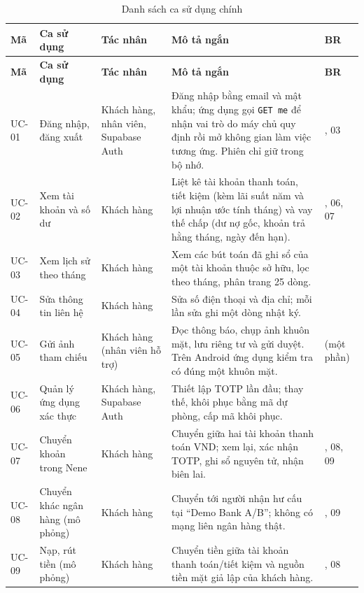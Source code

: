 {\small
\begin{longtable}{>{\raggedright\arraybackslash}p{}>{\raggedright\arraybackslash}p{}>{\raggedright\arraybackslash}p{}>{\raggedright\arraybackslash}p{}>{\raggedright\arraybackslash}p{}}
\caption{Danh sách ca sử dụng chính}\label{tab:ch2-usecases}\\
\toprule
\textbf{Mã} & \textbf{Ca sử dụng} & \textbf{Tác nhân} & \textbf{Mô tả ngắn} & \textbf{BR} \\
\midrule
\endfirsthead
\toprule
\textbf{Mã} & \textbf{Ca sử dụng} & \textbf{Tác nhân} & \textbf{Mô tả ngắn} & \textbf{BR} \\
\midrule
\endhead
\bottomrule
\endfoot
UC-01 & Đăng nhập, đăng xuất & Khách hàng, nhân viên, Supabase Auth & Đăng nhập bằng email và mật khẩu; ứng dụng gọi \texttt{GET me} để nhận vai trò do máy chủ quy định rồi mở không gian làm việc tương ứng. Phiên chỉ giữ trong bộ nhớ. & 01, 03 \\
UC-02 & Xem tài khoản và số dư & Khách hàng & Liệt kê tài khoản thanh toán, tiết kiệm (kèm lãi suất năm và lợi nhuận ước tính tháng) và vay thế chấp (dư nợ gốc, khoản trả hằng tháng, ngày đến hạn). & 05, 06, 07 \\
UC-03 & Xem lịch sử theo tháng & Khách hàng & Xem các bút toán đã ghi sổ của một tài khoản thuộc sở hữu, lọc theo tháng, phân trang 25 dòng. & 08 \\
UC-04 & Sửa thông tin liên hệ & Khách hàng & Sửa số điện thoại và địa chỉ; mỗi lần sửa ghi một dòng nhật ký. & 02 \\
UC-05 & Gửi ảnh tham chiếu & Khách hàng (nhân viên hỗ trợ) & Đọc thông báo, chụp ảnh khuôn mặt, lưu riêng tư và gửi duyệt. Trên Android ứng dụng kiểm tra có đúng một khuôn mặt. & 03 (một phần) \\
UC-06 & Quản lý ứng dụng xác thực & Khách hàng, Supabase Auth & Thiết lập TOTP lần đầu; thay thế, khôi phục bằng mã dự phòng, cấp mã khôi phục. & 04 \\
UC-07 & Chuyển khoản trong Nene & Khách hàng & Chuyển giữa hai tài khoản thanh toán VND; xem lại, xác nhận TOTP, ghi sổ nguyên tử, nhận biên lai. & 04, 08, 09 \\
UC-08 & Chuyển khác ngân hàng (mô phỏng) & Khách hàng & Chuyển tới người nhận hư cấu tại ``Demo Bank A/B''; không có mạng liên ngân hàng thật. & 04, 09 \\
UC-09 & Nạp, rút tiền (mô phỏng) & Khách hàng & Chuyển tiền giữa tài khoản thanh toán/tiết kiệm và nguồn tiền mặt giả lập của khách hàng. & 04, 08 \\

\end{longtable}}
